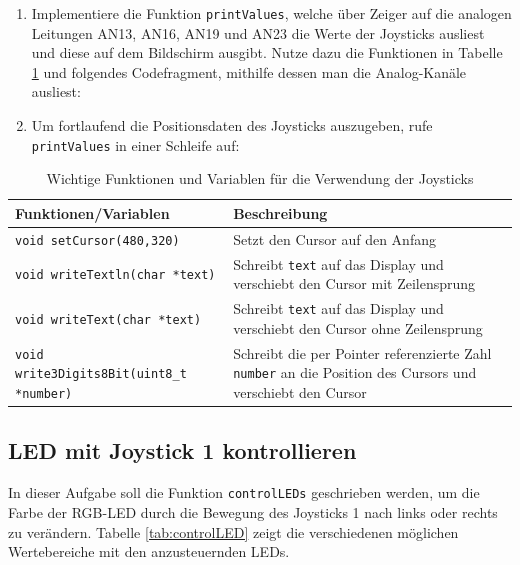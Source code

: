 \begin{enumerate}
\item
Implementiere die Funktion \lstinline|printValues|, welche über Zeiger auf die analogen Leitungen AN13, AN16, AN19 und AN23 die Werte der Joysticks ausliest und diese auf dem Bildschirm ausgibt.  
Nutze dazu die Funktionen in Tabelle \ref{tab:joystickInfo} und folgendes Codefragment, mithilfe dessen man die Analog-Kanäle ausliest:


\item 
Um fortlaufend die Positionsdaten des Joysticks auszugeben, rufe \lstinline|printValues| in einer Schleife auf:

\end{enumerate}

\begin{table}[!htb]
    \centering
    \caption{Wichtige Funktionen und Variablen für die Verwendung der Joysticks}
    \label{tab:joystickInfo}
    \begin{tabular}{p{7cm}p{7cm}}
        \toprule
        \textbf{Funktionen/Variablen} & \textbf{Beschreibung} \\
        \midrule
        \lstinline|void setCursor(480,320)| & Setzt den Cursor auf den Anfang \\
        \lstinline|void writeTextln(char *text)| & Schreibt \lstinline|text| auf das Display und verschiebt den Cursor mit Zeilensprung \\
        \lstinline|void writeText(char *text)| & Schreibt \lstinline|text| auf das Display und verschiebt den Cursor ohne Zeilensprung \\
        \lstinline|void write3Digits8Bit(uint8_t *number)| & Schreibt die per Pointer referenzierte Zahl \lstinline|number| an die Position des Cursors und verschiebt den Cursor\\
        \bottomrule
    \end{tabular}
\end{table}


\subsection{LED mit Joystick 1 kontrollieren}
In dieser Aufgabe soll die Funktion \lstinline|controlLEDs| geschrieben werden, um die Farbe der RGB-LED durch die Bewegung des Joysticks 1 nach links oder rechts zu verändern.
Tabelle \ref{tab:controlLED} zeigt die verschiedenen möglichen Wertebereiche mit den anzusteuernden LEDs.

